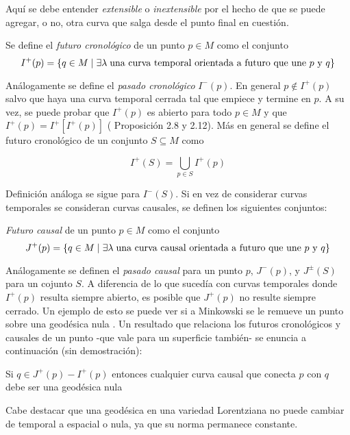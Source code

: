 Aquí se debe entender \textit{extensible} o \textit{inextensible} por el hecho de que se puede agregar, o no, otra curva que salga desde el punto final en cuestión.

\begin{definition}
Se define el \textit{futuro cronológico} de un punto $p\in M$ como el conjunto 
\[ I^+(p)=\{q\in M \mid \exists \lambda \hspace{0.1cm} \text{una curva temporal orientada a futuro que une $p$ y $q$\}} \]
\end{definition}

Análogamente se define el \textit{pasado cronológico} $I^-(p)$. En general $p\notin I^+(p)$  salvo que haya una curva temporal cerrada tal que empiece
y termine en $p$. A su vez, se puede probar que $I^+(p)$ es abierto para todo $p\in M$ y que $I^+(p)=I^+[I^+(p)]$ (\citep{Penrose} Proposición 2.8 y 2.12). Más en general se define el futuro cronológico de un conjunto $S\subseteq M$ como

\[I^+(S)=\bigcup\limits_{p\in S} I^+(p)\]

Definición análoga se sigue para $I^-(S)$. Si en vez de considerar curvas temporales se consideran curvas causales, se definen los siguientes conjuntos:

\begin{definition}
\textit{Futuro causal} de un punto $p\in M$ como el conjunto 
\[ J^+(p)=\{q\in M \mid \exists \lambda \hspace{0.1cm} \text{una curva causal orientada a futuro que une $p$ y $q$\}} \]
\end{definition}

Análogamente se definen el \textit{pasado causal} para un punto $p$, $J^-(p)$, y $J^{\pm}(S)$ para un cojunto $S$. A diferencia de lo que sucedía con curvas temporales donde $I^+(p)$ resulta siempre abierto, es posible que $J^+(p)$ no resulte siempre cerrado. Un ejemplo de esto se puede ver si a Minkowski se le remueve un punto sobre una geodésica nula \citep{Penrose}. Un resultado que relaciona los futuros cronológicos y causales de un punto -que vale para un superficie también- se enuncia a continuación (sin demostración):

\begin{lemma}
Si $q\in J^+(p)-I^+(p)$ entonces cualquier curva causal que conecta $p$ con $q$ debe ser una geodésica nula
\end{lemma}

Cabe destacar que una geodésica en una variedad Lorentziana no puede cambiar de temporal a espacial o nula, ya que su norma permanece constante.

